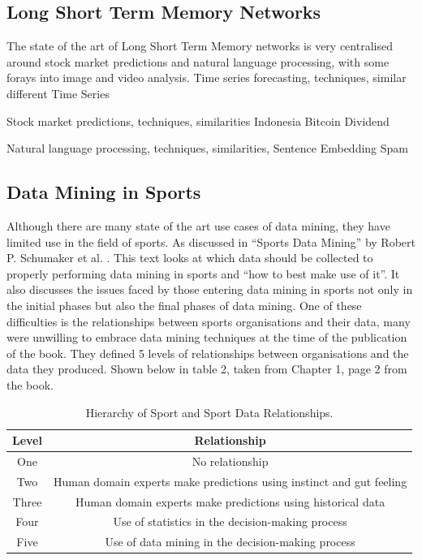 \documentclass{imc-inf}
\begin{document}
	\subsection{Long Short Term Memory Networks}	
	The state of the art of Long Short Term Memory networks is very centralised around stock market predictions and natural language processing, with some forays into image and video analysis. 
	Time series forecasting, techniques, similar different
	Time Series \cite{10.1145/3453800.3453812}
	
	Stock market predictions, techniques, similarities 
	Indonesia\cite{10.1145/3568231.3568249}
	Bitcoin \cite{10.1145/3546157.3546162}
	Dividend \cite{10.1145/3474880.3474898}
	
	Natural language processing, techniques, similarities, 
	Sentence Embedding \cite{10.1109/TASLP.2016.2520371}
	Spam \cite{10.1145/3234781.3234794}
	
	\subsection{Data Mining in Sports}
	Although there are many state of the art use cases of data mining, they have limited use in the field of sports. As discussed in “Sports Data Mining” by Robert P. Schumaker et al. \cite{SportDM}. This text looks at which data should be collected to properly performing data mining in sports and “how to best make use of it”. It also discusses the issues faced by those entering data mining in sports not only in the initial phases but also the final phases of data mining. One of these difficulties is the relationships between sports organisations and their data, many were unwilling to embrace data mining techniques at the time of the publication of the book. They defined 5 levels of relationships between organisations and the data they produced. Shown below in table 2, taken from Chapter 1, page 2 from the book.
	
	\begin{table}[h!]
		\centering	
		\begin{tabular}{| c | c |}
			\hline
			Level & Relationship\\
			\hline
			One & No relationship \\
			\hline
			Two & Human domain experts make predictions using instinct and gut feeling \\
			\hline
			Three & Human domain experts make predictions using historical data \\
			\hline
			Four & Use of statistics in the decision-making process \\
			\hline
			Five & Use of data mining in the decision-making process  \\
			\hline			
		\end{tabular}
		\caption{\label {tab:Sport Data Relation}Hierarchy of Sport and Sport Data Relationships.}		
	\end{table}
	
\end{document}
